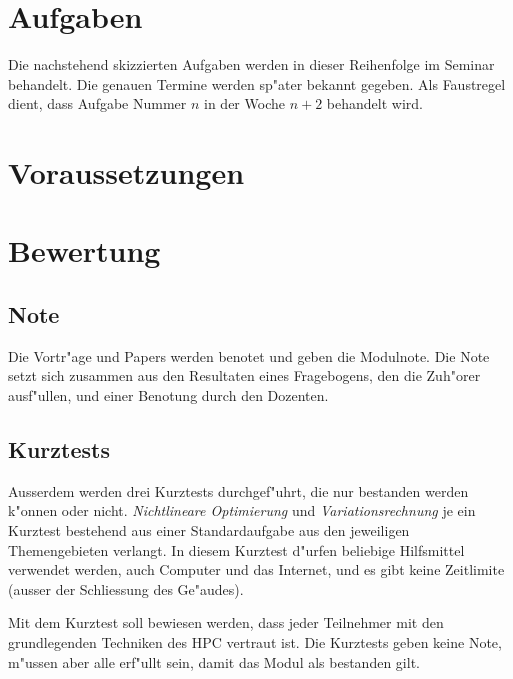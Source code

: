 \documentclass[a4paper,12pt]{article}
\begin{document}
\section{Aufgaben}
Die nachstehend skizzierten Aufgaben werden in dieser Reihenfolge im
Seminar behandelt. Die genauen Termine werden sp"ater bekannt
gegeben. Als Faustregel dient, dass Aufgabe Nummer $n$ in der Woche
$n + 2$ behandelt wird.

\newtheorem{aufgabe}{Aufgabe}













\section{Voraussetzungen}

\section{Bewertung}
\subsection{Note}
Die Vortr"age und Papers werden benotet und geben die Modulnote.
Die Note setzt sich zusammen aus den Resultaten eines Fragebogens,
den die Zuh"orer ausf"ullen, und einer Benotung durch den Dozenten.

\subsection{Kurztests}
Ausserdem werden drei Kurztests durchgef"uhrt, die nur bestanden
werden k"onnen oder nicht. 
{\em Nichtlineare Optimierung} und {\em Variationsrechnung} je
ein Kurztest bestehend aus einer Standardaufgabe aus den jeweiligen
Themengebieten verlangt. In diesem Kurztest d"urfen beliebige Hilfsmittel
verwendet werden, auch Computer und das Internet, und es gibt keine
Zeitlimite (ausser der Schliessung des Ge"audes).

Mit dem Kurztest
soll bewiesen werden, dass jeder Teilnehmer mit den grundlegenden
Techniken des HPC vertraut ist.
Die Kurztests geben keine Note, m"ussen aber alle erf"ullt sein,
damit das Modul als bestanden gilt.
\end{document}
